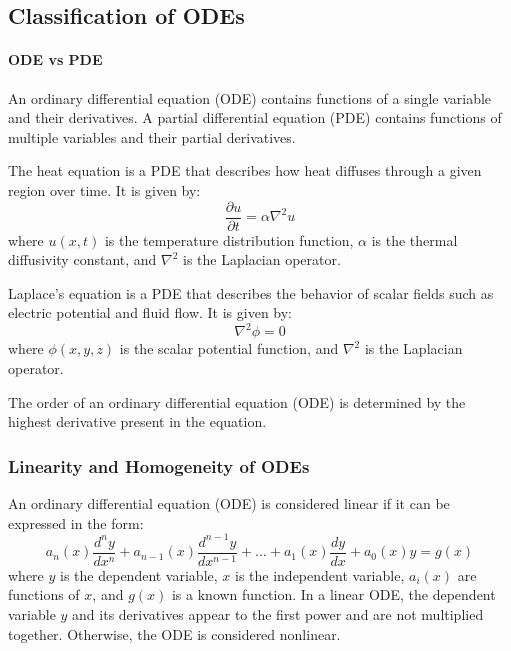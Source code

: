 \documentclass[11pt]{article}
\begin{document}
\subsection{Classification of ODEs}

\begin{shaded}
\paragraph{ODE vs PDE} An ordinary differential equation (ODE) contains functions of a single variable and their derivatives. A partial differential equation (PDE) contains functions of multiple variables and their partial derivatives.
\begin{example}
    The heat equation is a PDE that describes how heat diffuses through a given region over time. It is given by:
    $$
    \frac{\partial u}{\partial t} = \alpha \nabla^2 u 
    $$
    where \( u(x, t) \) is the temperature distribution function, \( \alpha \) is the thermal diffusivity constant, and \( \nabla^2 \) is the Laplacian operator.
\end{example}
\begin{example}
    Laplace's equation is a PDE that describes the behavior of scalar fields such as electric potential and fluid flow. It is given by:
    $$
    \nabla^2 \phi = 0
    $$
    where \( \phi(x, y, z) \) is the scalar potential function, and \( \nabla^2 \) is the Laplacian operator.
    
\end{example}
\end{shaded}
\begin{definition}
    The order of an ordinary differential equation (ODE) is determined by the highest derivative present in the equation.
\end{definition}
\subsubsection{Linearity and Homogeneity of ODEs}
\begin{definition}
    An ordinary differential equation (ODE) is considered linear if it can be expressed in the form:
    $$
    a_n(x) \frac{d^n y}{dx^n} + a_{n-1}(x) \frac{d^{n-1} y}{dx^{n-1}} + \ldots + a_1(x) \frac{dy}{dx} + a_0(x) y = g(x)
    $$
    where \( y \) is the dependent variable, \( x \) is the independent variable, \( a_i(x) \) are functions of \( x \), and \( g(x) \) is a known function. In a linear ODE, the dependent variable \( y \) and its derivatives appear to the first power and are not multiplied together. Otherwise, the ODE is considered nonlinear.    
\end{definition}
\end{document}
